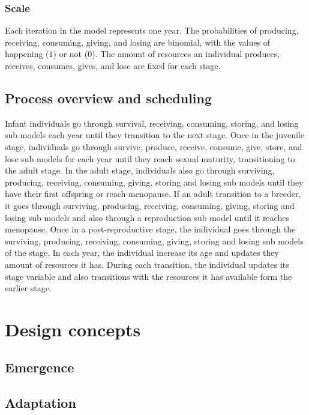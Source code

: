 \documentclass{article}
\begin{document}
\subsubsection{Scale}

Each iteration in the model represents one year. The probabilities  of producing, receiving, consuming, giving, and losing are binomial, with the values of happening ($1$) or not ($0$). The amount of resources an individual produces, receives, consumes, gives, and lose are fixed for each stage.

\subsection{Process overview and scheduling}

Infant individuals go through survival, receiving, consuming, storing, and losing sub models each year until they transition to the next stage. Once in the juvenile stage, individuals go through survive, produce, receive, consume, give, store, and lose sub models for each year until they reach sexual maturity, transitioning to the adult stage. In the adult stage, individuals also go through surviving, producing, receiving, consuming, giving, storing and losing sub models until they have their first offspring or reach menopause. If an adult transition to a breeder, it goes through surviving, producing, receiving, consuming, giving, storing and losing sub models and also through a reproduction sub model until it reaches menopause. Once in a post-reproductive stage, the individual goes through the surviving, producing, receiving, consuming, giving, storing and losing sub models of the stage. In each year, the individual increase its age and updates they amount of resources it has. During each transition, the individual updates its stage variable and also transitions with the resources it has available form the earlier stage.

\section{Design concepts}

\subsection{Emergence}



\subsection{Adaptation}
\end{document}
